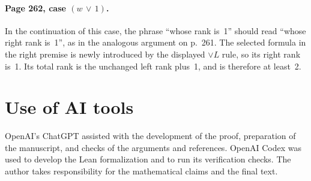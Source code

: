 \documentclass[11pt]{article}
\begin{document}
\paragraph{Page 262, case $(w\,\vee\,1)$.}
In the continuation of this case, the phrase ``whose rank is~1''
should read ``whose right rank is~1'', as in the analogous
argument on p.~261. The selected formula in the right premise
is newly introduced by the displayed $\vee L$ rule, so its right
rank is~1. Its total rank is the unchanged left rank plus~1,
and is therefore at least~2.

\section*{Use of AI tools}
OpenAI's ChatGPT assisted with the development of the proof, preparation
of the manuscript, and checks of the arguments and references. OpenAI Codex
was used to develop the Lean formalization and to run its verification
checks. The author takes responsibility for the mathematical claims and
the final text.

\clearpage
\begingroup
\small
\setlength{\bibsep}{2pt}


\endgroup
\end{document}
